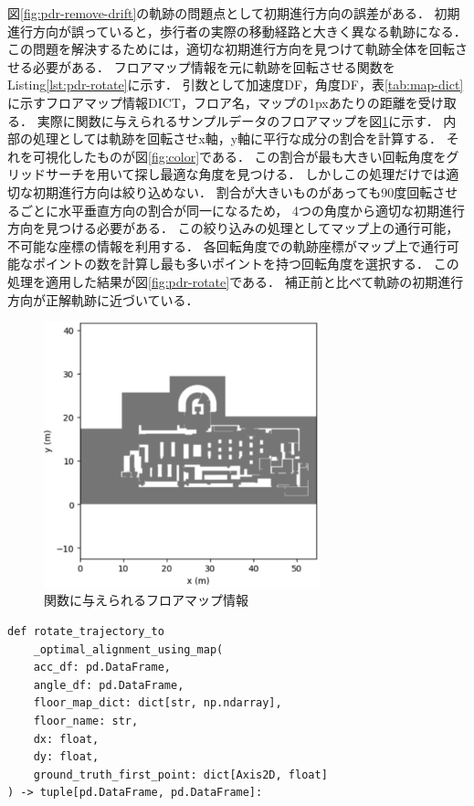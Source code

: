 
図\ref{fig:pdr-remove-drift}の軌跡の問題点として初期進行方向の誤差がある．
初期進行方向が誤っていると，歩行者の実際の移動経路と大きく異なる軌跡になる．
この問題を解決するためには，適切な初期進行方向を見つけて軌跡全体を回転させる必要がある．
フロアマップ情報を元に軌跡を回転させる関数をListing\ref{lst:pdr-rotate}に示す．
引数として加速度DF，角度DF，表\ref{tab:map-dict}に示すフロアマップ情報DICT，フロア名，マップの1pxあたりの距離を受け取る．
実際に関数に与えられるサンプルデータのフロアマップを図\ref{fig:floor-map}に示す．
内部の処理としては軌跡を回転させx軸，y軸に平行な成分の割合を計算する．
それを可視化したものが図\ref{fig:color}である．
この割合が最も大きい回転角度をグリッドサーチを用いて探し最適な角度を見つける．
しかしこの処理だけでは適切な初期進行方向は絞り込めない．
割合が大きいものがあっても90度回転させるごとに水平垂直方向の割合が同一になるため，
4つの角度から適切な初期進行方向を見つける必要がある．
この絞り込みの処理としてマップ上の通行可能，不可能な座標の情報を利用する．
各回転角度での軌跡座標がマップ上で通行可能なポイントの数を計算し最も多いポイントを持つ回転角度を選択する．
この処理を適用した結果が図\ref{fig:pdr-rotate}である．
補正前と比べて軌跡の初期進行方向が正解軌跡に近づいている．


\begin{figure}[ht]
	\centering
	\includegraphics[width=80mm]{image/floor-map.jpg}
  \caption{関数に与えられるフロアマップ情報} \label{fig:floor-map}
\end{figure}


\begin{lstlisting}[caption={フロアマップ情報を使用した  \\初期進行方向補正}, label=lst:pdr-rotate,float =h]
def rotate_trajectory_to
    _optimal_alignment_using_map(
    acc_df: pd.DataFrame,
    angle_df: pd.DataFrame,
    floor_map_dict: dict[str, np.ndarray],
    floor_name: str,
    dx: float,
    dy: float,
    ground_truth_first_point: dict[Axis2D, float]
) -> tuple[pd.DataFrame, pd.DataFrame]:

\end{lstlisting}

